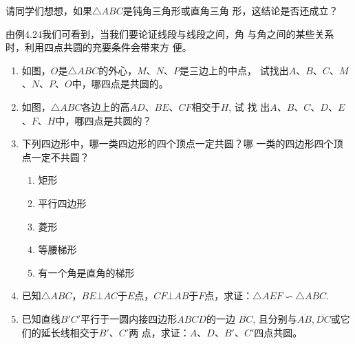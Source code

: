请同学们想想，如果$\triangle ABC$是钝角三角形或直角三角
形，这结论是否还成立？

由例4.24我们可看到，当我们要论证线段与线段之间，角
与角之间的某些关系时，利用四点共圆的充要条件会带来方
便。

\begin{ex}
\begin{enumerate}
  \item 如图，$O$是$\triangle ABC$的外心，$M$、$N$、$P$是三边上的中点，
  试找出$A$、$B$、$C$、$M$、$N$、$P$、$O$中，哪四点是共圆的。

  \item  如图，$\triangle ABC$各边上的高$AD$、$BE$、$CF$相交于$H$, 试
  找
  出$A$、$B$、$C$、$D$、$E$、$F$、$H$中，哪四点是共圆的？
  \item 下列四边形中，哪一类四边形的四个顶点一定共圆？哪
  一类的四边形四个顶点一定不共圆？
\begin{multicols}{2}
  \begin{enumerate}
    \item 矩形
    \item 平行四边形
    \item 菱形
    \item 等腰梯形
    \item 有一个角是直角的梯形
  \end{enumerate}
\end{multicols}
  \item 已知$\triangle ABC$，$BE\bot AC$于$E$点，$CF\bot AB$于$F$点，求证：$\triangle AEF\backsim \triangle ABC$.
  \item 已知直线$B'C'$平行于一圆内接四边形$ABCD$的一边
  $\overline{BC}$, 且分别与$\overline{AB},\overline{DC}$或它们的延长线相交于$B'$、$C'$两
  点，求证：$A$、$D$、$B'$、$C'$四点共圆。
\end{enumerate}
\end{ex}

